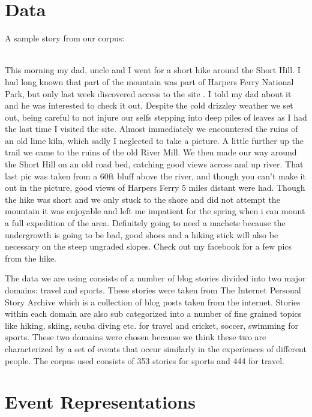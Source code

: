\documentclass[12pt]{article}
\begin{document}
\section{Data}
A sample story from our corpus: \\
\smallskip \\
\begin{mdframed}
	\small This morning my dad, uncle and I went for a short hike around the Short Hill. I had long known that part of the mountain was part of Harpers Ferry National Park, but only last week discovered access to the site . I told my dad about it and he was interested to check it out. Despite the cold drizzley weather we set out, being careful to not injure our selfs stepping into deep piles of leaves as I had the last time I visited the site. Almost immediately we encountered the ruins of an old lime kiln, which sadly I neglected to take a picture. A little further up the trail we came to the ruins of the old River Mill. We then made our way around the Short Hill on an old road bed, catching good views across and up river. That last pic was taken from a 60ft bluff above the river, and though you can't make it out in the picture, good views of Harpers Ferry 5 miles distant were had. Though the hike was short and we only stuck to the shore and did not attempt the mountain it was enjoyable and left me impatient for the spring when i can mount a full expedition of the area. Definitely going to need a machete because the undergrowth is going to be bad, good shoes and a hiking stick will also be necessary on the steep ungraded slopes. Check out my facebook for a few pics from the hike. 
\end{mdframed} 
\vspace{2em}
The data we are using consists of a number of blog stories divided into two major domains:  travel and sports. These stories were taken from The Internet Personal Story Archive\cite{ipsa} which is a collection of blog posts taken from the internet. Stories within each domain are also sub categorized into a number of fine grained topics like hiking, skiing, scuba diving etc. for travel and cricket, soccer, swimming for sports. These two domains were chosen because we think these two are characterized by a set of events that occur similarly in the experiences of different people. The corpus used consists of 353 stories for sports and 444 for travel.

\section{Event Representations}
\end{document}
